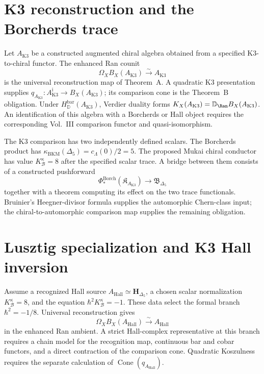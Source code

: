 \section{K3 reconstruction and the Borcherds trace}
\label{sec:bcinv-supplement}

\begin{remark}
\label{rem:bcinv-inversion-K3}
Let $A_{\mathrm{K3}}$ be a constructed augmented chiral algebra
obtained from a specified K3-to-chiral functor.  The enhanced Ran
counit
\[
 \Omega_XB_X(A_{\mathrm{K3}})\xrightarrow{\sim}A_{\mathrm{K3}}
\]
is the universal reconstruction map of Theorem~A.  A quadratic K3
presentation supplies
$q_{A_{\mathrm{K3}}}\colon A_{\mathrm{K3}}^{\mathrm i}\to
B_X(A_{\mathrm{K3}})$; its comparison cone is the Theorem~B
obligation.  Under $H_{\mathbb D}^{\mathrm{bar}}(A_{\mathrm{K3}})$, Verdier duality
forms
$K_X(A_{\mathrm{K3}})=\mathbb D_{\Ran}B_X(A_{\mathrm{K3}})$.
An identification of this algebra with a Borcherds or Hall object
requires the corresponding Vol.~III comparison functor and
quasi-isomorphism.
\end{remark}

\begin{remark}
\label{rem:bcinv-phi-trace}
The K3 comparison has two independently defined scalars.  The
Borcherds product has
$\kappa_{\mathrm{BKM}}(\Delta_5)=c_\Lambda(0)/2=5$.  The proposed
Mukai chiral conductor has value $K^\kappa_{\mathcal B}=8$ after the
specified scalar trace.  A bridge between them consists of a
constructed pushforward
\[
 \Phi^{\mathrm{Borch}}_*(\mathfrak K_{A_{\mathrm{K3}}})
 \longrightarrow \mathfrak B_{\Delta_5}
\]
together with a theorem computing its effect on the two trace
functionals.  Bruinier's Heegner-divisor formula supplies the
automorphic Chern-class input; the chiral-to-automorphic comparison
map supplies the remaining obligation.
\end{remark}

\section{Lusztig specialization and K3 Hall inversion}
\label{sec:bcai-deep}

\begin{remark}[The formal branch $\hbar^2=-1/8$;
\ClaimStatusConditional]
\label{rem:bcai-deep-1}
Assume a recognized Hall source
$A_{\mathrm{Hall}}\simeq\mathbf H_{\Delta_5}$, a chosen scalar
normalization $K^\kappa_{\mathcal B}=8$, and the equation
$\hbar^2K^\kappa_{\mathcal B}=-1$.  These data select the formal branch
$\hbar^2=-1/8$.  Universal reconstruction gives
\[
 \Omega_XB_X(A_{\mathrm{Hall}})
 \xrightarrow{\sim}A_{\mathrm{Hall}}
\]
in the enhanced Ran ambient.  A strict Hall-complex representative at
this branch requires a chain model for the recognition map, continuous
bar and cobar functors, and a direct contraction of the comparison
cone.  Quadratic Koszulness requires the separate calculation of
$\operatorname{Cone}(q_{A_{\mathrm{Hall}}})$.
\end{remark}

